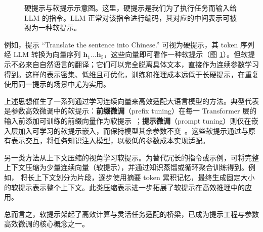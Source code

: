 \begin{figure}[!t]
\centering

\caption{硬提示与软提示示意图。这里，硬提示是我们为了执行任务而输入给 LLM 的指令。LLM 正常对该指令进行编码，其对应的中间表示可被视为一种软提示。}
\label{fig:hard-and-soft-prompt-examples}
\end{figure}

\noindent 例如，提示 ``Translate the sentence into Chinese.'' 可视为硬提示，其 token 序列经 LLM 转换为向量序列 $\mathbf{h}_1...\mathbf{h}_5$，这些向量即可看作一种软提示（图 \ref{fig:hard-and-soft-prompt-examples}）。但软提示不必来自自然语言的翻译；它们可以完全脱离具体文本，直接作为连续参数学习得到。这样的表示密集、低维且可优化，训练和推理成本远低于长硬提示，在重复使用同一提示的场景中尤为实用。

上述思想催生了一系列通过学习连续向量来高效适配大语言模型的方法。典型代表是参数高效微调中的软提示：\textbf{前缀微调}（prefix tuning）在每一 Transformer 层的输入前添加可训练的前缀向量作为软提示~\cite{li-liang:2021prefix}；\textbf{提示微调}（prompt tuning）则仅在嵌入层加入可学习的软提示嵌入，而保持模型其余参数不变~\cite{lester-etal:2021power}。这些软提示通过与原有表示交互，将任务知识注入模型，以极低的参数成本实现适配。

另一类方法从上下文压缩的视角学习软提示。为替代冗长的指令或示例，可将完整上下文压缩为少量连续向量（软提示），并通过知识蒸馏或循环聚合训练得到。例如，\citet{chevalier-etal:2023adapting} 将长上下文划分为片段，逐步使用摘要 token 累积记忆，最终生成固定大小的软提示表示整个上下文。此类压缩表示进一步拓展了软提示在高效推理中的应用。

总而言之，软提示架起了高效计算与灵活任务适配的桥梁，已成为提示工程与参数高效微调的核心概念之一。
